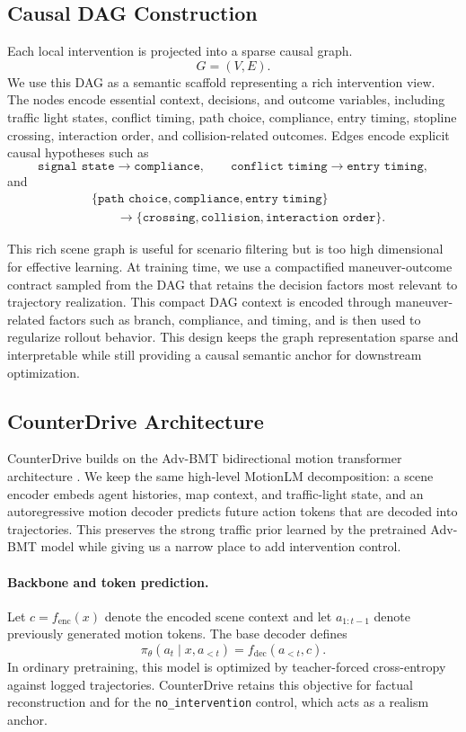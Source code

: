 \documentclass{article}
\begin{document}
\subsection{Causal DAG Construction}
\label{sec:causal-dag-interface}

Each local intervention is projected into a sparse causal graph.
\[
G=(V,E).
\]
We use this DAG as a semantic scaffold representing a rich intervention view. The nodes encode essential context, decisions, and outcome variables, including traffic light states, conflict timing, path choice, compliance, entry timing, stopline crossing, interaction order, and collision-related outcomes. Edges encode explicit causal hypotheses such as
\[
\texttt{signal state} \rightarrow \texttt{compliance}, \qquad
\texttt{conflict timing} \rightarrow \texttt{entry timing},
\]
and
\[
\begin{aligned}
&\{\texttt{path choice}, \texttt{compliance}, \texttt{entry timing}\} \\
&\qquad\rightarrow \{\texttt{crossing}, \texttt{collision}, \texttt{interaction order}\}.
\end{aligned}
\]

This rich scene graph is useful for scenario filtering but is too high dimensional for effective learning. At training time, we use a compactified maneuver-outcome contract sampled from the DAG that retains the decision factors most relevant to trajectory realization. This compact DAG context is encoded through maneuver-related factors such as branch, compliance, and timing, and is then used to regularize rollout behavior. This design keeps the graph representation sparse and interpretable while still providing a causal semantic anchor for downstream optimization.

\subsection{CounterDrive Architecture}
\label{sec:semantic-control}

CounterDrive builds on the Adv-BMT bidirectional motion transformer architecture \citep{liu2025advbmt}. We keep the same high-level MotionLM decomposition: a scene encoder embeds agent histories, map context, and traffic-light state, and an autoregressive motion decoder predicts future action tokens that are decoded into trajectories. This preserves the strong traffic prior learned by the pretrained Adv-BMT model while giving us a narrow place to add intervention control.

\paragraph{Backbone and token prediction.}
Let $c = f_{\mathrm{enc}}(x)$ denote the encoded scene context and let $a_{1:t-1}$ denote previously generated motion tokens. The base decoder defines
\[
\pi_{\theta}(a_t \mid x,a_{<t}) =
f_{\mathrm{dec}}(a_{<t},c).
\]
In ordinary pretraining, this model is optimized by teacher-forced cross-entropy against logged trajectories. CounterDrive retains this objective for factual reconstruction and for the \texttt{no\_intervention} control, which acts as a realism anchor.
\end{document}

